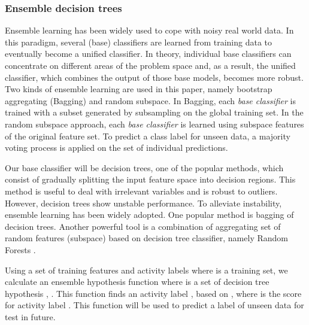 \documentclass{sig-alternate}
\begin{document}
\subsubsection{Ensemble decision trees}
Ensemble learning has been widely used to cope with noisy real world data. In this paradigm, several (base) classifiers are learned from training data to eventually become a unified classifier. In theory, individual base classifiers can concentrate on different areas of the problem space and, as a result, the unified classifier, which combines the output of those base models, becomes more robust. Two kinds of ensemble learning are used in this paper, namely bootstrap aggregating (Bagging) and random subspace. In Bagging, each \textit{base classifier} is trained with a subset generated by subsampling on the global training set. In the random subspace approach, each \textit{base classifier} is learned using subspace features of the original feature set. To predict a class label for unseen data, a majority voting process is applied on the set of individual predictions.

 Our base classifier will be decision trees, one of the popular methods, which consist of gradually splitting the input feature space into decision regions. This method is useful to deal with irrelevant variables and is robust to outliers. However, decision trees show unstable performance. To alleviate instability, ensemble learning has been widely adopted. One popular method is bagging of decision trees. Another powerful tool is a combination of aggregating set of random features (subspace) based on decision tree classifier, namely Random Forests  \cite{Ho1998RandomSubspaceForests}.


Using a set of training features and activity labels  where   is a training set, we calculate an ensemble hypothesis function  where  is a set of decision tree hypothesis , . This function finds an activity label , based on , where  is the score for activity label . This function will be used to predict a label of unseen data  for test in future.
\end{document}
